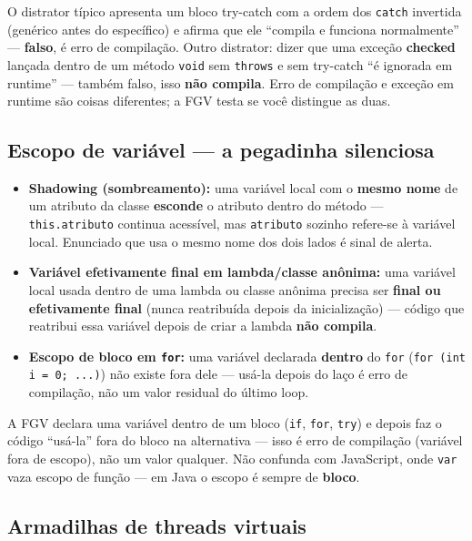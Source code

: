 \begin{pegadinha}
O distrator típico apresenta um bloco try-catch com a ordem dos \texttt{catch}
invertida (genérico antes do específico) e afirma que ele ``compila e
funciona normalmente'' --- \textbf{falso}, é erro de compilação. Outro
distrator: dizer que uma exceção \textbf{checked} lançada dentro de um método
\texttt{void} sem \texttt{throws} e sem try-catch ``é ignorada em runtime''
--- também falso, isso \textbf{não compila}. Erro de compilação e exceção em
runtime são coisas diferentes; a FGV testa se você distingue as duas.
\end{pegadinha}

\subsection{Escopo de variável --- a pegadinha silenciosa}

\begin{itemize}
\item \textbf{Shadowing (sombreamento):} uma variável local com o
\textbf{mesmo nome} de um atributo da classe \textbf{esconde} o atributo
dentro do método --- \texttt{this.atributo} continua acessível, mas
\texttt{atributo} sozinho refere-se à variável local. Enunciado que usa o
mesmo nome dos dois lados é sinal de alerta.
\item \textbf{Variável efetivamente final em lambda/classe anônima:} uma
variável local usada dentro de uma lambda ou classe anônima precisa ser
\textbf{final ou efetivamente final} (nunca reatribuída depois da
inicialização) --- código que reatribui essa variável depois de criar a
lambda \textbf{não compila}.
\item \textbf{Escopo de bloco em \texttt{for}:} uma variável declarada
\textbf{dentro} do \texttt{for} (\texttt{for (int i = 0; ...)}) não existe
fora dele --- usá-la depois do laço é erro de compilação, não um valor
residual do último loop.
\end{itemize}

\begin{pegadinha}
A FGV declara uma variável dentro de um bloco (\texttt{if}, \texttt{for},
\texttt{try}) e depois faz o código ``usá-la'' fora do bloco na alternativa
--- isso é erro de compilação (variável fora de escopo), não um valor
qualquer. Não confunda com JavaScript, onde \texttt{var} vaza escopo de
função --- em Java o escopo é sempre de \textbf{bloco}.
\end{pegadinha}

\subsection{Armadilhas de threads virtuais}

